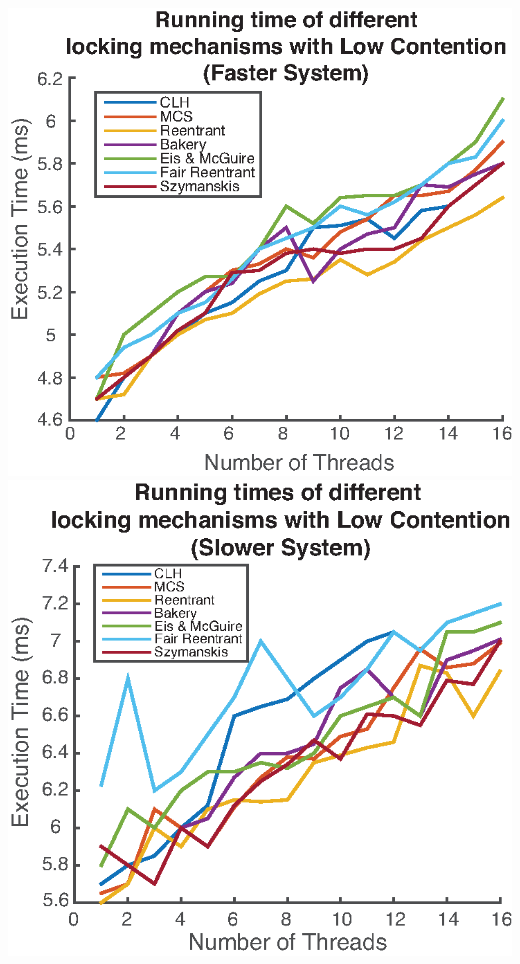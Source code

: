 \documentclass[FinalReport.tex]{subfiles}
\begin{document}
	\includegraphics[scale = .8]{myComp_lowCont16.eps}
	\includegraphics[scale = .8]{evanComp_lowCont.eps}

\bigskip
\end{document}
